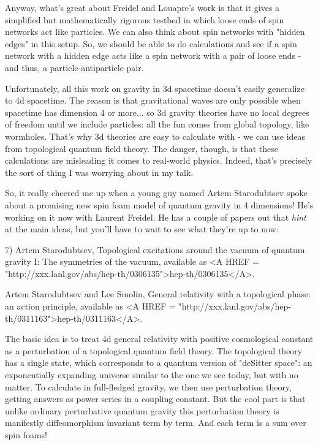 Anyway, what's great about Freidel and Louapre's work is that it gives
a simplified but mathematically rigorous testbed in which loose ends 
of spin networks act like particles.  We can also think about spin 
networks with "hidden edges" in this setup.  So, we should be able to 
do calculations and see if a spin network with a hidden edge acts like 
a spin network with a pair of loose ends - and thus, a particle-antiparticle 
pair.

Unfortunately, all this work on gravity in 3d spacetime doesn't easily
generalize to 4d spacetime.  The reason is that gravitational waves are 
only possible when spacetime has dimension 4 or more... so 3d gravity 
theories have no local degrees of freedom until we include particles: 
all the fun comes from global topology, like wormholes.  That's why 3d 
theories are easy to calculate with - we can use ideas from topological
quantum field theory.  The danger, though, is that these calculations 
are misleading it comes to real-world physics.  Indeed, that's precisely
the sort of thing I was worrying about in my talk.  

So, it really cheered me up when a young guy named Artem Starodubtsev
spoke about a promising new spin foam model of quantum gravity in 4 
dimensions!  He's working on it now with Laurent Freidel.  He has a 
couple of papers out that \emph{hint} at the main ideas, but you'll have to 
wait to see what they're up to now:

7) Artem Starodubtsev, Topological excitations around the vacuum of 
quantum gravity I: The symmetries of the vacuum, available as 
<A HREF = "http://xxx.lanl.gov/abs/hep-th/0306135">hep-th/0306135</A>.

Artem Starodubtsev and Lee Smolin, General relativity with a topological 
phase: an action principle, available as <A HREF = "http://xxx.lanl.gov/abs/hep-th/0311163">hep-th/0311163</A>.

The basic idea is to treat 4d general relativity with positive 
cosmological constant as a perturbation of a topological quantum 
field theory.  The topological theory has a single state, which 
corresponds to a quantum version of "deSitter space": an exponentially
expanding universe similar to the one we see today, but with no
matter.  To calculate in full-fledged gravity, we then use perturbation
theory, getting answers as power series in a coupling constant.  
But the cool part is that unlike ordinary perturbative quantum gravity
this perturbation theory is manifestly diffeomorphism invariant 
term by term.  And each term is a sum over spin foams!

